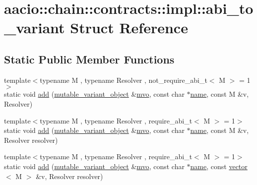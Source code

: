 \hypertarget{structaacio_1_1chain_1_1contracts_1_1impl_1_1abi__to__variant}{}\section{aacio\+:\+:chain\+:\+:contracts\+:\+:impl\+:\+:abi\+\_\+to\+\_\+variant Struct Reference}
\label{structaacio_1_1chain_1_1contracts_1_1impl_1_1abi__to__variant}
\subsection*{Static Public Member Functions}
\begin{DoxyCompactItemize}
\item 
{\footnotesize template$<$typename M , typename Resolver , not\+\_\+require\+\_\+abi\+\_\+t$<$ M $>$  = 1$>$ }\\static void \mbox{\hyperlink{structaacio_1_1chain_1_1contracts_1_1impl_1_1abi__to__variant_a8da8deee98fad24fca317ec24b936316}{add}} (\mbox{\hyperlink{classfc_1_1mutable__variant__object}{mutable\+\_\+variant\+\_\+object}} \&\mbox{\hyperlink{classfc_1_1mutable__variant__object}{mvo}}, const char $\ast$\mbox{\hyperlink{structaacio_1_1chain_1_1name}{name}}, const M \&v, Resolver)
\item 
{\footnotesize template$<$typename M , typename Resolver , require\+\_\+abi\+\_\+t$<$ M $>$  = 1$>$ }\\static void \mbox{\hyperlink{structaacio_1_1chain_1_1contracts_1_1impl_1_1abi__to__variant_ad54bf1f05dd90f1b2ac21588f6b09578}{add}} (\mbox{\hyperlink{classfc_1_1mutable__variant__object}{mutable\+\_\+variant\+\_\+object}} \&\mbox{\hyperlink{classfc_1_1mutable__variant__object}{mvo}}, const char $\ast$\mbox{\hyperlink{structaacio_1_1chain_1_1name}{name}}, const M \&v, Resolver resolver)
\item 
{\footnotesize template$<$typename M , typename Resolver , require\+\_\+abi\+\_\+t$<$ M $>$  = 1$>$ }\\static void \mbox{\hyperlink{structaacio_1_1chain_1_1contracts_1_1impl_1_1abi__to__variant_ac7a9ba9de94f296c9d34a7dc5ada10df}{add}} (\mbox{\hyperlink{classfc_1_1mutable__variant__object}{mutable\+\_\+variant\+\_\+object}} \&\mbox{\hyperlink{classfc_1_1mutable__variant__object}{mvo}}, const char $\ast$\mbox{\hyperlink{structaacio_1_1chain_1_1name}{name}}, const \mbox{\hyperlink{classstd_1_1vector}{vector}}$<$ M $>$ \&v, Resolver resolver)

\end{DoxyCompactItemize}
